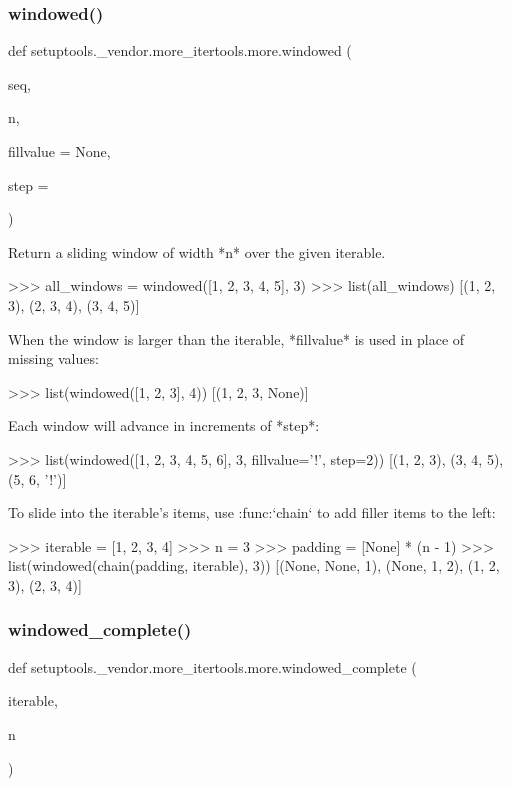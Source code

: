 \subsubsection{\texorpdfstring{windowed()}{windowed()}}
{\footnotesize\ttfamily def setuptools.\+\_\+vendor.\+more\+\_\+itertools.\+more.\+windowed (\begin{DoxyParamCaption}\item[{}]{seq,  }\item[{}]{n,  }\item[{}]{fillvalue = {\ttfamily None},  }\item[{}]{step = {} }\end{DoxyParamCaption})}

\begin{DoxyVerb}Return a sliding window of width *n* over the given iterable.

    >>> all_windows = windowed([1, 2, 3, 4, 5], 3)
    >>> list(all_windows)
    [(1, 2, 3), (2, 3, 4), (3, 4, 5)]

When the window is larger than the iterable, *fillvalue* is used in place
of missing values:

    >>> list(windowed([1, 2, 3], 4))
    [(1, 2, 3, None)]

Each window will advance in increments of *step*:

    >>> list(windowed([1, 2, 3, 4, 5, 6], 3, fillvalue='!', step=2))
    [(1, 2, 3), (3, 4, 5), (5, 6, '!')]

To slide into the iterable's items, use :func:`chain` to add filler items
to the left:

    >>> iterable = [1, 2, 3, 4]
    >>> n = 3
    >>> padding = [None] * (n - 1)
    >>> list(windowed(chain(padding, iterable), 3))
    [(None, None, 1), (None, 1, 2), (1, 2, 3), (2, 3, 4)]
\end{DoxyVerb}
 \mbox{\label{namespacesetuptools_1_1__vendor_1_1more__itertools_1_1more_a0a9494bd8a93efcf205854f97da47518}} 
\subsubsection{\texorpdfstring{windowed\+\_\+complete()}{windowed\_complete()}}
{\footnotesize\ttfamily def setuptools.\+\_\+vendor.\+more\+\_\+itertools.\+more.\+windowed\+\_\+complete (\begin{DoxyParamCaption}\item[{}]{iterable,  }\item[{}]{n }\end{DoxyParamCaption})}

